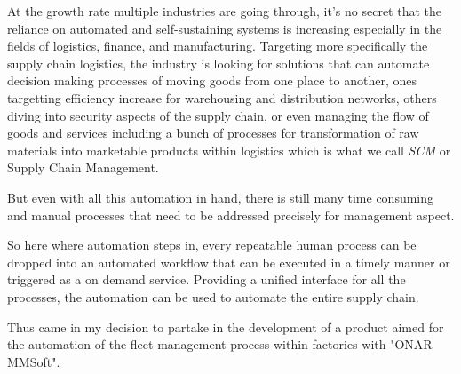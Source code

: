 At the growth rate multiple industries are going through, it's no secret that the reliance
on automated and self-sustaining systems is increasing especially in the fields of
logistics, finance, and manufacturing. Targeting more specifically the supply chain
logistics, the industry is looking for solutions that can automate decision making
processes of moving goods from one place to another, ones targetting efficiency increase
for warehousing and distribution networks, others diving into security aspects of the
supply chain, or even managing the flow of goods and services including a bunch of
processes for transformation of raw materials into marketable products within logistics
which is what we call \emph{SCM} or Supply Chain Management.

But even with all this automation in hand, there is still many time consuming and manual
processes that need to be addressed precisely for management aspect.

So here where automation steps in, every repeatable human process can be dropped into an
automated workflow that can be executed in a timely manner or triggered as a on demand
service. Providing a unified interface for all the processes, the automation can be used
to automate the entire supply chain.

Thus came in my decision to partake in the development of a product aimed for the
automation of the fleet management process within factories with "ONAR MMSoft".

